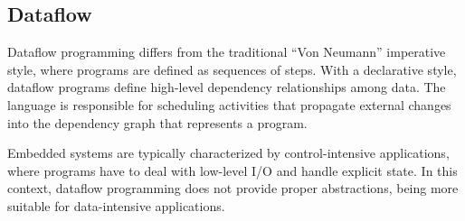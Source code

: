 \documentclass[pdftex,12pt,a4paper]{article}
\newcommand{\code}[1] {{\small{\texttt{#1}}}}
\begin{document}


\subsection{Dataflow}

Dataflow programming \cite{lustre.ieee91,lucid,frp.principles} differs from the 
traditional ``Von Neumann'' imperative style, where programs are defined as 
sequences of steps.
With a declarative style, dataflow programs define high-level dependency 
relationships among data.
The language is responsible for scheduling activities that propagate external 
changes into the dependency graph that represents a program.

Embedded systems are typically characterized by control-intensive applications, 
where programs have to deal with low-level I/O and handle explicit state.
In this context, dataflow programming does not provide proper abstractions, 
being more suitable for data-intensive applications.
\end{document}

